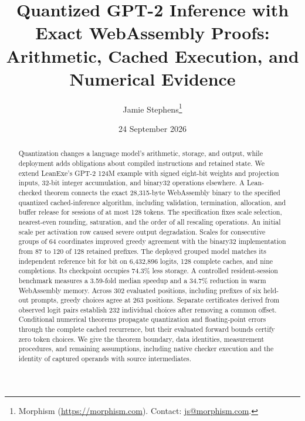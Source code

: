\documentclass[11pt]{article}
\title{Quantized GPT-2 Inference with Exact WebAssembly Proofs:\\
Arithmetic, Cached Execution, and Numerical Evidence}
\author{Jamie Stephens\thanks{Morphism (\url{https://morphism.com}).  Contact: \href{mailto:js@morphism.com}{js@morphism.com}.}}
\date{24 September 2026}
\begin{document}
\maketitle
\begin{abstract}
Quantization changes a language model's arithmetic, storage, and output, while deployment adds obligations about compiled instructions and retained state.  We extend LeanExe's GPT-2 124M example with signed eight-bit weights and projection inputs, 32-bit integer accumulation, and binary32 operations elsewhere.  A Lean-checked theorem connects the exact 28,315-byte WebAssembly binary to the specified quantized cached-inference algorithm, including validation, termination, allocation, and buffer release for sessions of at most 128 tokens.  The specification fixes scale selection, nearest-even rounding, saturation, and the order of all rescaling operations.  An initial scale per activation row caused severe output degradation.  Scales for consecutive groups of 64 coordinates improved greedy agreement with the binary32 implementation from 87 to 120 of 128 retained prefixes.  The deployed grouped model matches its independent reference bit for bit on 6,432,896 logits, 128 complete caches, and nine completions.  Its checkpoint occupies 74.3\% less storage.  A controlled resident-session benchmark measures a 3.59-fold median speedup and a 34.7\% reduction in warm WebAssembly memory.  Across 302 evaluated positions, including prefixes of six held-out prompts, greedy choices agree at 263 positions.  Separate certificates derived from observed logit pairs establish 232 individual choices after removing a common offset.  Conditional numerical theorems propagate quantization and \mbox{floating-point} errors through the complete cached recurrence, but their evaluated forward bounds certify zero token choices.  We give the theorem boundary, data identities, measurement procedures, and remaining assumptions, including native checker execution and the identity of captured operands with source intermediates.
\end{abstract}
\tableofcontents
\clearpage








\appendix



\end{document}
